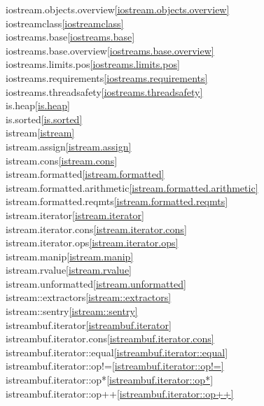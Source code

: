 \begin{multicols}{2}
iostream.objects.overview\quad\ref{iostream.objects.overview}\\
iostreamclass\quad\ref{iostreamclass}\\
iostreams.base\quad\ref{iostreams.base}\\
iostreams.base.overview\quad\ref{iostreams.base.overview}\\
iostreams.limits.pos\quad\ref{iostreams.limits.pos}\\
iostreams.requirements\quad\ref{iostreams.requirements}\\
iostreams.threadsafety\quad\ref{iostreams.threadsafety}\\
is.heap\quad\ref{is.heap}\\
is.sorted\quad\ref{is.sorted}\\
istream\quad\ref{istream}\\
istream.assign\quad\ref{istream.assign}\\
istream.cons\quad\ref{istream.cons}\\
istream.formatted\quad\ref{istream.formatted}\\
istream.formatted.arithmetic\quad\ref{istream.formatted.arithmetic}\\
istream.formatted.reqmts\quad\ref{istream.formatted.reqmts}\\
istream.iterator\quad\ref{istream.iterator}\\
istream.iterator.cons\quad\ref{istream.iterator.cons}\\
istream.iterator.ops\quad\ref{istream.iterator.ops}\\
istream.manip\quad\ref{istream.manip}\\
istream.rvalue\quad\ref{istream.rvalue}\\
istream.unformatted\quad\ref{istream.unformatted}\\
istream::extractors\quad\ref{istream::extractors}\\
istream::sentry\quad\ref{istream::sentry}\\
istreambuf.iterator\quad\ref{istreambuf.iterator}\\
istreambuf.iterator.cons\quad\ref{istreambuf.iterator.cons}\\
istreambuf.iterator::equal\quad\ref{istreambuf.iterator::equal}\\
istreambuf.iterator::op!=\quad\ref{istreambuf.iterator::op!=}\\
istreambuf.iterator::op*\quad\ref{istreambuf.iterator::op*}\\
istreambuf.iterator::op++\quad\ref{istreambuf.iterator::op++}\\

\end{multicols}
